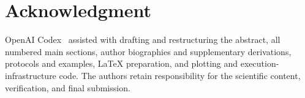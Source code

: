 \documentclass{ieeeaccess}
\begin{document}




\FloatBarrier







\section*{Acknowledgment}
OpenAI Codex~\cite{openaiCodex2026} assisted with drafting and restructuring
the abstract, all numbered main sections, author biographies and supplementary derivations, protocols and examples,
LaTeX preparation, and plotting and execution-infrastructure code.
The authors retain responsibility for the scientific content, verification,
and final submission.
\FloatBarrier



\EOD
\end{document}
